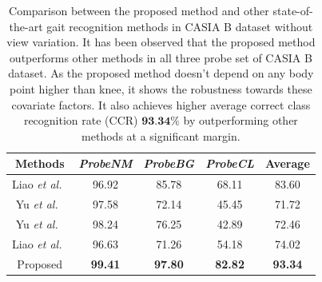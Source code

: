 \begin{table}[t]
	\centering
	\caption{Comparison between the proposed method and other state-of-the-art gait recognition methods in CASIA B dataset without view variation. It has been observed that the proposed method outperforms other methods in all three probe set of CASIA B dataset. As the proposed method doesn't depend on any body point higher than knee, it shows the robustness towards these covariate factors. It also achieves higher average correct class recognition rate (CCR) $\textbf{93.34\%}$ by outperforming other methods at a significant margin. \label{table:comp_casia_b_without_view}}
	
	{\begin{tabular*}{25pc}{ccccc}\hline
			
			Methods &\textit{ProbeNM} &\textit{ProbeBG} &\textit{ProbeCL} &Average\\
			\hline
			
			Liao \textit{et al.}~\cite{Liao_19} &96.92 &85.78 &68.11 &83.60 \\ 
			
			\noalign{\smallskip}
			Yu \textit{et al.}~\cite{Yu_17_spae}  &97.58  &72.14 &45.45 &71.72 \\
			
			\noalign{\smallskip}
			Yu \textit{et al.}~\cite{Yu_19} &98.24  &76.25  &42.89  &72.46 \\
			
			\noalign{\smallskip}
			Liao \textit{et al.}~\cite{Liao_19}  &96.63  &71.26  &54.18  &74.02 \\
			
			\noalign{\smallskip}
			Proposed &\textbf{99.41} &\textbf{97.80} &\textbf{82.82} &\textbf{93.34} \\
			\hline
	\end{tabular*}}{}
\end{table}

